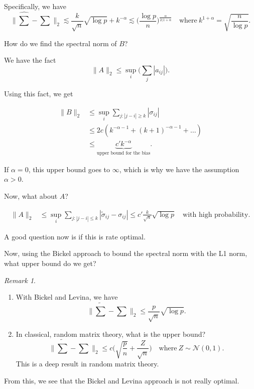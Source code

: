 \documentclass[twoside]{article}
\theoremstyle{definition}
\theoremstyle{definition}
\theoremstyle{remark}
\newtheorem*{rem}{Remark}
\begin{document}
Specifically, we have 
\[
\| \widehat\sum - \sum \|_2 \lesssim \frac{k}{\sqrt{n}} \sqrt{\log p} + k^{-\alpha} \lesssim \bigg( \frac{\log p}{n} \bigg)^{\frac{\alpha}{2(1+\alpha}} \quad \text{where} \ k^{1+\alpha} = \sqrt{\frac{n}{\log p}}.
\]

How do we find the spectral norm of $B$?

We have the fact
\[
\| A \|_2 \leq \sup \limits_i \bigg( \sum \limits_j | a_{ij} | \bigg).
\]

Using this fact, we get

\[
\begin{aligned}
\| B \|_2 &\leq \sup \limits_i \sum \limits_{j: |j-i| \geq k} | \sigma_{ij} | \\
&\leq 2c(k^{-\alpha - 1} + (k+1)^{-\alpha - 1} + \ldots) \\
&\leq \underbrace{c' k^{-\alpha}}_\text{upper bound for the bias}.
\end{aligned}
\]

If $\alpha = 0$, this upper bound goes to $\infty$, which is why we have the assumption $\alpha > 0$.

Now, what about $A$?

\[
\begin{aligned}
\| A \|_2 &\leq \sup \limits_i \sum \limits_{j: |j-i| \leq k} | \widetilde{\sigma}_{ij} - \sigma_{ij} | \leq c' \frac{k}{\sqrt{n}} \sqrt{\log p} \quad \text{with high probability.}
\end{aligned}
\]

A good question now is if this is rate optimal.

Now, using the Bickel approach to bound the spectral norm with the L1 norm, what upper bound do we get?

\begin{rem}
\begin{enumerate}
\item With Bickel and Levina, we have
\[
\| \widetilde \sum - \sum \|_2 \leq \frac{p}{\sqrt{n}} \sqrt{\log p}.
\]
\item In classical, random matrix theory, what is the upper bound?
\[
\| \widetilde \sum - \sum \|_2 \leq c \bigg( \sqrt{\frac{p}{n}} + \frac{Z}{\sqrt{n}} \bigg) \quad \text{where} \ Z \sim \mathcal{N}(0,1).
\]
This is a deep result in random matrix theory.
\end{enumerate}
\end{rem}

From this, we see that the Bickel and Levina approach is not really optimal.
\end{document}
